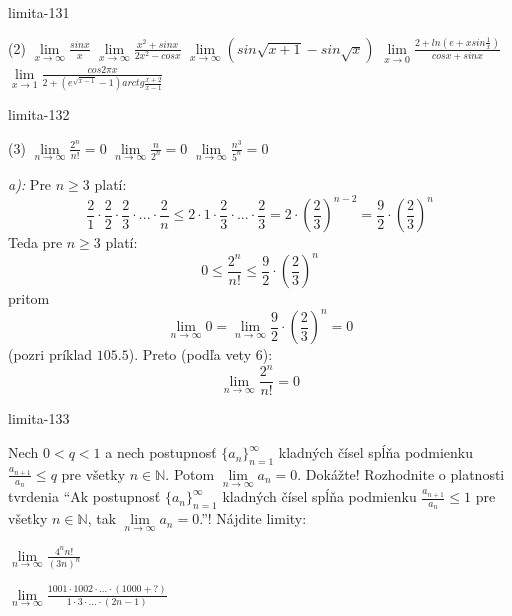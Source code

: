 \begin{defproblem}{limita-131}
\begin{tasks}(2)
    \task $\lim\limits_{{x \rightarrow \infty}} \frac{sin x}{x}$
    \task $\lim\limits_{{x \rightarrow \infty}} \frac{x^2+sin x}{2x^2-cos x}$
    \task $\lim\limits_{{x \rightarrow \infty}} (sin \sqrt{x+1}-sin \sqrt{x})$
    \task $\lim\limits_{{x \rightarrow 0}} \frac{2+ln (e+x sin \frac{1}{x})}{cos x + sin x}$
    \task $\lim\limits_{{x \rightarrow 1}} \frac{cos 2\pi x}{2+(e^{\sqrt{x-1}}-1)arctg \frac{x+2}{x-1}}$
\end{tasks}
\end{defproblem}

\begin{defproblem}{limita-132}
\begin{tasks}(3)
\task $\lim\limits_{n \rightarrow \infty} \frac{2^n}{n!}=0$
\task $\lim\limits_{n \rightarrow \infty} \frac{n}{2^n}=0$
\task $\lim\limits_{n \rightarrow \infty} \frac{n^3}{5^n}=0$
\end{tasks}

\begin{solution}
    \textit{a):}
    Pre $n \geq 3$ platí:
    \[
        \frac{2}{1}\cdot \frac{2}{2}\cdot \frac{2}{3}\cdot ...
        \cdot \frac{2}{n} \leq 2 \cdot 1 \cdot \frac{2}{3} \cdot ... \cdot
        \frac{2}{3}
        = 2 \cdot (\frac{2}{3})^{n-2}
        = \frac{9}{2} \cdot (\frac{2}{3})^n
    \]
    Teda pre $n \geq 3$ platí:
    \[
        0 \leq \frac{2^n}{n!}\leq \frac{9}{2}\cdot
        (\frac{2}{3})^n
    \]
    pritom
    \[
        \lim\limits_{n \rightarrow \infty} 0
        = \lim\limits_{n \rightarrow \infty} \frac{9}{2} \cdot (\frac{2}{3})^n=0
    \]
    (pozri príklad $105.5$). Preto (podľa vety $6$):
    \[
        \lim\limits_{n \rightarrow \infty} \frac{2^n}{n!}=0
    \]
\end{solution}
\end{defproblem}

\begin{defproblem}{limita-133}
\begin{tasks}
\task Nech $0<q<1$ a nech postupnosť ${\{a_n\}}_{n=1}^\infty$ kladných čísel
spĺňa podmienku $\frac{a_{n+1}}{a_{n}} \leq q$ pre všetky $n \in \mathbb{N}$.
Potom $\lim\limits_{n \rightarrow \infty} a_n=0$. Dokážte!
\task Rozhodnite o platnosti tvrdenia \enquote{Ak postupnosť ${\{a_n\}}_{n=1}^\infty$
kladných čísel spĺňa podmienku $\frac{a_{n+1}}{a_{n}} \leq 1$ pre všetky $n \in
\mathbb{N}$, tak $\lim\limits_{n \rightarrow \infty} a_n=0$.}!
\task Nájdite limity:
\begin{enumerate*}
    \item $\lim\limits_{n \rightarrow \infty} \frac{4^n n!}{(3n)^n}$
    \item $\lim\limits_{n \rightarrow \infty} \frac{1001 \cdot 1002 \cdot ...
            \cdot (1000+?)}{1 \cdot 3 \cdot ... \cdot (2n-1)}$
\end{enumerate*}
\end{tasks}
\end{defproblem}

